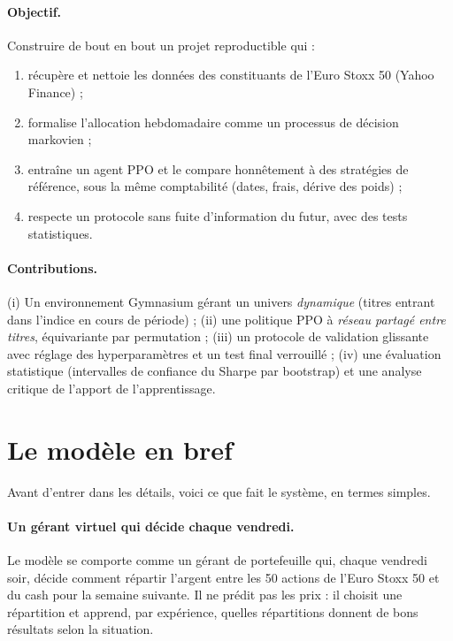 \documentclass[11pt,a4paper]{article}
\begin{document}
\paragraph{Objectif.} Construire de bout en bout un projet reproductible qui :
\begin{enumerate}
  \item récupère et nettoie les données des constituants de l'Euro Stoxx 50 (Yahoo Finance) ;
  \item formalise l'allocation hebdomadaire comme un processus de décision markovien ;
  \item entraîne un agent PPO et le compare honnêtement à des stratégies de référence, sous la même
        comptabilité (dates, frais, dérive des poids) ;
  \item respecte un protocole sans fuite d'information du futur, avec des tests statistiques.
\end{enumerate}

\paragraph{Contributions.} (i) Un environnement Gymnasium gérant un univers \emph{dynamique} (titres entrant
dans l'indice en cours de période) ; (ii) une politique PPO à \emph{réseau partagé entre titres},
équivariante par permutation ; (iii) un protocole de validation glissante avec réglage des hyperparamètres
et un test final verrouillé ; (iv) une évaluation statistique (intervalles de confiance du Sharpe par
bootstrap) et une analyse critique de l'apport de l'apprentissage.

\section{Le modèle en bref}

Avant d'entrer dans les détails, voici ce que fait le système, en termes simples.

\paragraph{Un gérant virtuel qui décide chaque vendredi.} Le modèle se comporte comme un gérant de portefeuille
qui, chaque vendredi soir, décide comment répartir l'argent entre les 50 actions de l'Euro Stoxx 50 et du cash
pour la semaine suivante. Il ne prédit pas les prix : il choisit une répartition et apprend, par expérience,
quelles répartitions donnent de bons résultats selon la situation.
\end{document}
